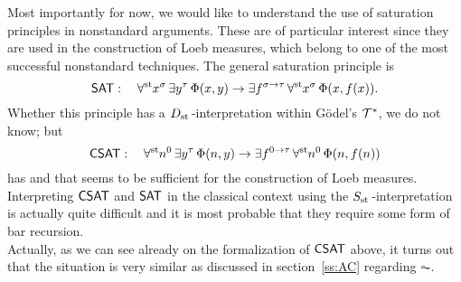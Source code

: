 Most importantly for now, we would like to understand the use of saturation principles in nonstandard arguments. These are of particular interest since they are used in the construction of Loeb measures, which belong to one of the most successful nonstandard techniques. 
The general saturation principle is
\[ \textsf{\upshape SAT}: \quad \forall^{\operatorname{st}{}}\! x^\sigma \, \exists y^\tau \, \Phi(x, y) \to \exists f^{\sigma \to \tau} \, \forall^{\operatorname{st}{}}\! x^\sigma \, \Phi(x, f(x)). \]
Whether this principle has a $\protect{D_{\operatorname{st}{}}}$-interpretation within G\"odel's $\mathcal{T}^*$, we do not know; but
\[ \textsf{\upshape CSAT}: \quad \forall^{\operatorname{st}{}}\! n^0 \, \exists y^\tau \, \Phi(n, y) \to \exists f^{0 \to \tau} \, \forall^{\operatorname{st}{}}\! n^0 \, \Phi(n, f(n)) \]
has and that seems to be sufficient for the construction of Loeb measures. Interpreting $\textsf{\upshape CSAT}$ and $\textsf{\upshape SAT}$ in the classical context using the $\protect{S_{\operatorname{st}{}}}$-interpretation is actually quite difficult and it is most probable that they require some form of bar recursion. \\
Actually, as we can see already on the formalization of $\textsf{\upshape CSAT}$ above, it turns out that  the situation is very similar as discussed in section~\ref{ss:AC} regarding $\AC$.


